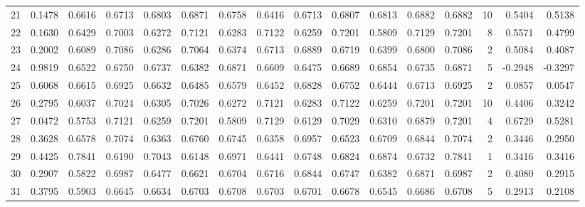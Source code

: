 \begin{tabular}{lrrrrrrrrrrrrrrr}
21  &      0.1478 &  0.6616 &  0.6713 &  0.6803 &  0.6871 &  0.6758 &  0.6416 &  0.6713 &  0.6807 &  0.6813 &   0.6882 &     0.6882 &     10 &                    0.5404 &                     0.5138 \\
22  &      0.1630 &  0.6429 &  0.7003 &  0.6272 &  0.7121 &  0.6283 &  0.7122 &  0.6259 &  0.7201 &  0.5809 &   0.7129 &     0.7201 &      8 &                    0.5571 &                     0.4799 \\
23  &      0.2002 &  0.6089 &  0.7086 &  0.6286 &  0.7064 &  0.6374 &  0.6713 &  0.6889 &  0.6719 &  0.6399 &   0.6800 &     0.7086 &      2 &                    0.5084 &                     0.4087 \\
24  &      0.9819 &  0.6522 &  0.6750 &  0.6737 &  0.6382 &  0.6871 &  0.6609 &  0.6475 &  0.6689 &  0.6854 &   0.6735 &     0.6871 &      5 &                   -0.2948 &                    -0.3297 \\
25  &      0.6068 &  0.6615 &  0.6925 &  0.6632 &  0.6485 &  0.6579 &  0.6452 &  0.6828 &  0.6752 &  0.6444 &   0.6713 &     0.6925 &      2 &                    0.0857 &                     0.0547 \\
26  &      0.2795 &  0.6037 &  0.7024 &  0.6305 &  0.7026 &  0.6272 &  0.7121 &  0.6283 &  0.7122 &  0.6259 &   0.7201 &     0.7201 &     10 &                    0.4406 &                     0.3242 \\
27  &      0.0472 &  0.5753 &  0.7121 &  0.6259 &  0.7201 &  0.5809 &  0.7129 &  0.6129 &  0.7029 &  0.6310 &   0.6879 &     0.7201 &      4 &                    0.6729 &                     0.5281 \\
28  &      0.3628 &  0.6578 &  0.7074 &  0.6363 &  0.6760 &  0.6745 &  0.6358 &  0.6957 &  0.6523 &  0.6709 &   0.6844 &     0.7074 &      2 &                    0.3446 &                     0.2950 \\
29  &      0.4425 &  0.7841 &  0.6190 &  0.7043 &  0.6148 &  0.6971 &  0.6441 &  0.6748 &  0.6824 &  0.6874 &   0.6732 &     0.7841 &      1 &                    0.3416 &                     0.3416 \\
30  &      0.2907 &  0.5822 &  0.6987 &  0.6477 &  0.6621 &  0.6704 &  0.6716 &  0.6844 &  0.6747 &  0.6382 &   0.6871 &     0.6987 &      2 &                    0.4080 &                     0.2915 \\
31  &      0.3795 &  0.5903 &  0.6645 &  0.6634 &  0.6703 &  0.6708 &  0.6703 &  0.6701 &  0.6678 &  0.6545 &   0.6686 &     0.6708 &      5 &                    0.2913 &                     0.2108 \\

\end{tabular}
